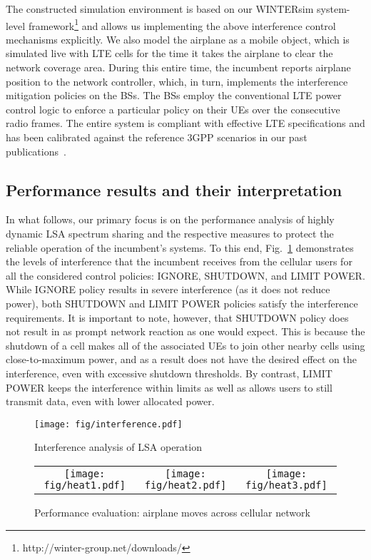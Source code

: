 \documentclass[journal]{IEEEtran}
\begin{document}
The constructed simulation environment is based on our WINTERsim system-level framework\footnote{http://winter-group.net/downloads/} and allows us implementing the above interference control mechanisms explicitly. We also model the airplane as a mobile object, which is simulated live with  LTE cells for the time it takes the airplane to clear the network coverage area. During this entire time, the incumbent reports airplane position to the network controller, which, in turn, implements the interference mitigation policies on the BSs. The BSs employ the conventional LTE power control logic to enforce a particular policy on their UEs over the consecutive radio frames. The entire system is compliant with effective LTE specifications and has been calibrated against the reference 3GPP scenarios in our past publications~\cite{And14_2}.

\subsection{Performance results and their interpretation}

In what follows, our primary focus is on the performance analysis of highly dynamic LSA spectrum sharing and the respective measures to protect the reliable operation of the incumbent's systems. To this end, Fig.~\ref{fig:interference} demonstrates the levels of interference that the incumbent receives from the cellular users for all the considered control policies: IGNORE, SHUTDOWN, and LIMIT POWER. While IGNORE policy results in severe interference (as it does not reduce power), both SHUTDOWN and LIMIT POWER policies satisfy the interference requirements. It is important to note, however, that SHUTDOWN policy does not result in as prompt network reaction as one would expect. This is because the shutdown of a cell makes all of the associated UEs to join other nearby cells using close-to-maximum power, and as a result does not have the desired effect on the interference, even with excessive shutdown thresholds. By contrast, LIMIT POWER keeps the interference within limits as well as allows users to still transmit data, even with lower allocated power.

\begin{figure}[!ht]
\centering
\texttt{[image: fig/interference.pdf]}
\caption{Interference analysis of LSA operation}
\label{fig:interference}
\end{figure}

\begin{figure*}[!ht]
\begin{tabular}{ccc}
\texttt{[image: fig/heat1.pdf]} & \texttt{[image: fig/heat2.pdf]}  & \texttt{[image: fig/heat3.pdf]}\tabularnewline
\end{tabular}
\caption{Performance evaluation: airplane moves across cellular network}
\label{fig:plane}
\end{figure*}
\end{document}

